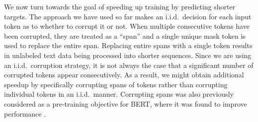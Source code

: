 \documentclass[twoside,11pt]{article}
\begin{document}
We now turn towards the goal of speeding up training by predicting shorter targets.
The approach we have used so far makes an i.i.d.\ decision for each input token as to whether to corrupt it or not.
When multiple consecutive tokens have been corrupted, they are treated as a ``span'' and a single unique mask token is used to replace the entire span.
Replacing entire spans with a single token results in unlabeled text data being processed into shorter sequences.
Since we are using an i.i.d.\ corruption strategy, it is not always the case that a significant number of corrupted tokens appear consecutively.
As a result, we might obtain additional speedup by specifically corrupting spans of tokens rather than corrupting individual tokens in an i.i.d.\ manner.
Corrupting spans was also previously considered as a pre-training objective for BERT, where it was found to improve performance \citep{joshi2019spanbert}.
\end{document}
